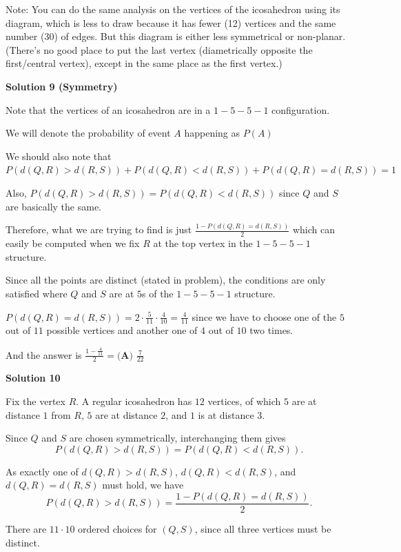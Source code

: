 \begin{enumerate}
 
Note: You can do the same analysis on the vertices of the icosahedron using its diagram, which is less to draw because it has fewer (12) vertices and the same number (30) of edges. But this diagram is either less symmetrical or non-planar. (There's no good place to put the last vertex (diametrically opposite the first/central vertex), except in the same place as the first vertex.)

 



\textbf{Solution 9 (Symmetry)}

Note that the vertices of an icosahedron are in a $1-5-5-1$ configuration.

 We will denote the probability of event $A$ happening as $P(A)$

 We should also note that $P(d(Q, R) > d(R, S)) + P(d(Q, R) < d(R, S)) + P(d(Q, R) = d(R, S)) = 1$

 Also, $P(d(Q, R) > d(R, S)) = P(d(Q, R) < d(R, S))$ since $Q$ and $S$ are basically the same.

 Therefore, what we are trying to find is just $\frac{1-P(d(Q, R) = d(R, S))}{2}$ which can easily be computed when we fix $R$ at the top vertex in the $1-5-5-1$ structure.

 Since all the points are distinct (stated in problem), the conditions are only satisfied where $Q$ and $S$ are at $5$s of the $1-5-5-1$ structure.

 $P(d(Q, R) = d(R, S)) = 2 \cdot \frac{5}{11} \cdot \frac{4}{10} = \frac{4}{11}$ since we have to choose one of the $5$ out of $11$ possible vertices and another one of $4$ out of $10$ two times.

 And the answer is $\frac{1-\frac{4}{11}}{2} = \boxed{ \textbf{(A) } \frac{7}{22}}$




\textbf{Solution 10}

Fix the vertex $R$. A regular icosahedron has $12$ vertices, of which $5$ are at distance $1$ from $R$, $5$ are at distance $2$, and $1$ is at distance $3$.

 Since $Q$ and $S$ are chosen symmetrically, interchanging them gives
 \[P(d(Q,R)>d(R,S))=P(d(Q,R)<d(R,S)).\]

 As exactly one of $d(Q,R)>d(R,S)$, $d(Q,R)<d(R,S)$, and $d(Q,R)=d(R,S)$ must hold, we have
 \[P(d(Q,R)>d(R,S))=\frac{1-P(d(Q,R)=d(R,S))}{2}.\]

 There are $11\cdot10$ ordered choices for $(Q,S)$, since all three vertices must be distinct.


\end{enumerate}
